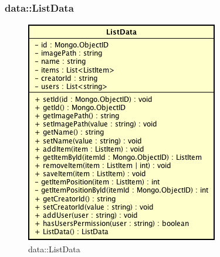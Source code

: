 \subsubsection{data::ListData}

\label{data::ListData}
\begin{figure}[H]
	\centering
	\includegraphics[scale=0.5]{Sezioni/SottosezioniST/img/app/ListData.png}
	\caption{data::ListData}
\end{figure}

